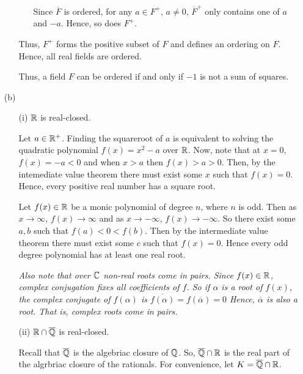 \documentclass[12pt]{article}
\begin{document}
\begin{solution}
\begin{enumerate}
\begin{enumerate}
\begin{enumerate}
                    Since $\overline{F}$ is ordered, for any $a \in F^+, \, a \neq 0$, $\overline{F}^+$ only contains one of $a$ and $-a$. Hence, so does $F^+$. 
                 \end{enumerate}
                
                Thus, $F^+$ forms the positive subset of $F$ and defines an ordering on $F$. Hence, all real fields are ordered. 

            Thus, a field $F$ can be ordered if and only if $-1$ is not a sum of squares. 
        \end{enumerate}

        \item [(b)] \begin{enumerate}
            \item [(i)]$\mathbb R$ is real-closed. 
            
            Let $a \in \mathbb R^+$. Finding the squareroot of $a$ is equivalent to solving the quadratic polynomial $f(x) = x^2 -a$ over $\mathbb R$. Now, note that at $x =0$, $f(x) = -a < 0$ and when $x > a$ then $f(x) > a > 0$. Then, by the intemediate value theorem there must exist some $x$ such that $f(x) = 0$. Hence, every positive real number has a square root.   

            Let $f(x) \in \mathbb R$ be a monic polynomial of degree $n$, where $n$ is odd. Then as $x \to \infty$, $f(x) \to \infty$ and as $x \to -\infty$, $f(x) \to -\infty$. So there exist some $a, b$ such that $f(a) < 0 < f(b)$. Then by the intermediate value theorem there must exist some $c$ such that $f(x) = 0$. Hence every odd degree polynomial has at least one real root. 
            \bbni 

            \textit{Also note that over $\mathbb C$ non-real roots come in pairs. Since $f(x) \in \mathbb R$, complex conjugation fixes all coefficients of $f$. So if $\alpha$ is a root of $f(x)$, the complex conjugate of $f(\alpha)$ is $\overline{f(\alpha)} = f(\overline{\alpha}) = 0$ Hence, $\overline{\alpha}$ is also a root. That is, complex roots come in pairs.}
            
            \bbni

            \item [(ii)] $\mathbb R \cap \overline{\mathbb Q}$ is real-closed. 
            
            Recall that $\overline{\mathbb Q}$ is the algebriac closure of $\mathbb Q$. So, $\overline{\mathbb Q} \cap \mathbb R$ is the real part of the algrbriac closure of the rationals. For convenience, let $K = \overline{\mathbb Q} \cap \mathbb R$. 


\end{enumerate}
\end{enumerate}
\end{solution}
\end{document}
